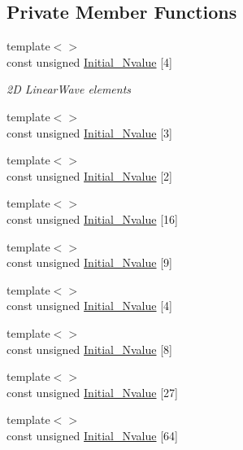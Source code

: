 \subsection*{Private Member Functions}
\begin{DoxyCompactItemize}
\item 
{\footnotesize template$<$$>$ }\\const unsigned \hyperlink{classoomph_1_1QLinearWaveElement_a7574b4cc7ca4e9b778e6b72aa26d362e}{Initial\+\_\+\+Nvalue} \mbox{[}4\mbox{]}
\begin{DoxyCompactList}\small\item\em 2D Linear\+Wave elements \end{DoxyCompactList}\item 
{\footnotesize template$<$$>$ }\\const unsigned \hyperlink{classoomph_1_1QLinearWaveElement_af31cb7564d802c1d280d533a0b4741cd}{Initial\+\_\+\+Nvalue} \mbox{[}3\mbox{]}
\item 
{\footnotesize template$<$$>$ }\\const unsigned \hyperlink{classoomph_1_1QLinearWaveElement_a961be768d058157a826416de8670f63c}{Initial\+\_\+\+Nvalue} \mbox{[}2\mbox{]}
\item 
{\footnotesize template$<$$>$ }\\const unsigned \hyperlink{classoomph_1_1QLinearWaveElement_a5ef241ca3154ed12cefc8c802e7d3e02}{Initial\+\_\+\+Nvalue} \mbox{[}16\mbox{]}
\item 
{\footnotesize template$<$$>$ }\\const unsigned \hyperlink{classoomph_1_1QLinearWaveElement_a0fea31f6262c09a227736f22c1a64e85}{Initial\+\_\+\+Nvalue} \mbox{[}9\mbox{]}
\item 
{\footnotesize template$<$$>$ }\\const unsigned \hyperlink{classoomph_1_1QLinearWaveElement_a12e7b5f35ca4ab8c9c40e3d4babbfdaf}{Initial\+\_\+\+Nvalue} \mbox{[}4\mbox{]}
\item 
{\footnotesize template$<$$>$ }\\const unsigned \hyperlink{classoomph_1_1QLinearWaveElement_ab0d1291bd078c6afef247eb958195732}{Initial\+\_\+\+Nvalue} \mbox{[}8\mbox{]}
\item 
{\footnotesize template$<$$>$ }\\const unsigned \hyperlink{classoomph_1_1QLinearWaveElement_a03fcffade80c1fcbde1273e7fcd17dbd}{Initial\+\_\+\+Nvalue} \mbox{[}27\mbox{]}
\item 
{\footnotesize template$<$$>$ }\\const unsigned \hyperlink{classoomph_1_1QLinearWaveElement_aafd40bcdd15b55a35ce27ffa454a6b8f}{Initial\+\_\+\+Nvalue} \mbox{[}64\mbox{]}
\end{DoxyCompactItemize}
